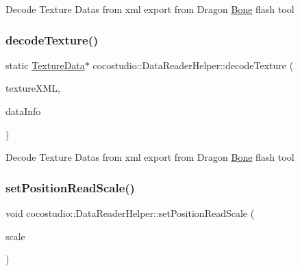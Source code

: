 Decode Texture Datas from xml export from Dragon \hyperlink{classcocostudio_1_1Bone}{Bone} flash tool \mbox{\label{classcocostudio_1_1DataReaderHelper_a7f509df8d383c000c81df30bafd2b8e7}} 
\subsubsection{\texorpdfstring{decode\+Texture()}{decodeTexture()}\hspace{0.1cm}{\footnotesize\ttfamily [2/2]}}
{\footnotesize\ttfamily static \hyperlink{classcocostudio_1_1TextureData}{Texture\+Data}$\ast$ cocostudio\+::\+Data\+Reader\+Helper\+::decode\+Texture (\begin{DoxyParamCaption}\item[{\hyperlink{classtinyxml2_1_1XMLElement}{tinyxml2\+::\+X\+M\+L\+Element} $\ast$}]{texture\+X\+ML,  }\item[{\hyperlink{structcocostudio_1_1DataReaderHelper_1_1__DataInfo}{Data\+Info} $\ast$}]{data\+Info }\end{DoxyParamCaption})\hspace{0.3cm}{\ttfamily [static]}}

Decode Texture Datas from xml export from Dragon \hyperlink{classcocostudio_1_1Bone}{Bone} flash tool \mbox{\label{classcocostudio_1_1DataReaderHelper_a78e64a51e15233c34328a5c3f1ef47e5}} 
\subsubsection{\texorpdfstring{set\+Position\+Read\+Scale()}{setPositionReadScale()}\hspace{0.1cm}{\footnotesize\ttfamily [1/2]}}
{\footnotesize\ttfamily void cocostudio\+::\+Data\+Reader\+Helper\+::set\+Position\+Read\+Scale (\begin{DoxyParamCaption}\item[{float}]{scale }\end{DoxyParamCaption})\hspace{0.3cm}{\ttfamily [static]}}

